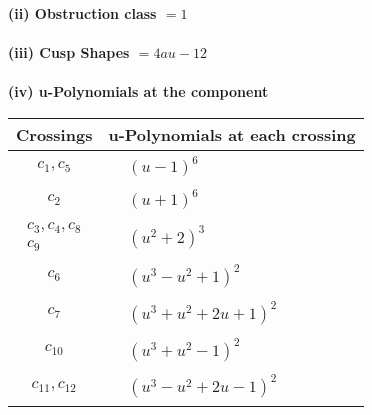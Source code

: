 \documentclass[1p]{elsarticle_modified}
\theoremstyle{definition}
\begin{document}
\flushleft \textbf{(ii) Obstruction class $= 1$}\\~\\
\flushleft \textbf{(iii) Cusp Shapes $= 4 a u-12$}\\~\\
\newpage\renewcommand{\arraystretch}{1}
\flushleft \textbf{(iv) u-Polynomials at the component}\newline \\
\begin{tabular}{m{50pt}|m{274pt}}
Crossings & \hspace{64pt}u-Polynomials at each crossing \\
\hline $$\begin{aligned}c_{1},c_{5}\end{aligned}$$&$\begin{aligned}
&(u-1)^6
\end{aligned}$\\
\hline $$\begin{aligned}c_{2}\end{aligned}$$&$\begin{aligned}
&(u+1)^6
\end{aligned}$\\
\hline $$\begin{aligned}c_{3},c_{4},c_{8}\\c_{9}\end{aligned}$$&$\begin{aligned}
&(u^2+2)^3
\end{aligned}$\\
\hline $$\begin{aligned}c_{6}\end{aligned}$$&$\begin{aligned}
&(u^3- u^2+1)^2
\end{aligned}$\\
\hline $$\begin{aligned}c_{7}\end{aligned}$$&$\begin{aligned}
&(u^3+u^2+2 u+1)^2
\end{aligned}$\\
\hline $$\begin{aligned}c_{10}\end{aligned}$$&$\begin{aligned}
&(u^3+u^2-1)^2
\end{aligned}$\\
\hline $$\begin{aligned}c_{11},c_{12}\end{aligned}$$&$\begin{aligned}
&(u^3- u^2+2 u-1)^2
\end{aligned}$\\
\hline
\end{tabular}\\~\\
\end{document}
